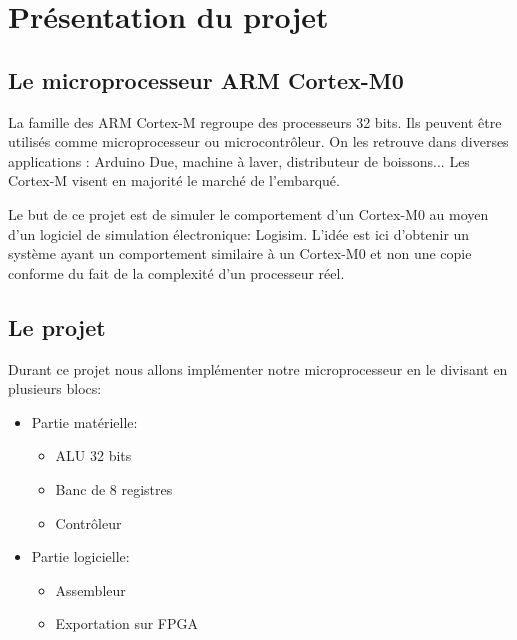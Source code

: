 \documentclass{article}
\begin{document}
    \section{Présentation du projet}

    \subsection{Le microprocesseur ARM Cortex-M0}

    La famille des ARM Cortex-M regroupe des processeurs 32 bits.
    Ils peuvent être utilisés comme microprocesseur ou microcontrôleur.
    On les retrouve dans diverses applications : Arduino Due, machine à laver, distributeur de boissons... Les Cortex-M visent en majorité le marché de l'embarqué.

    Le but de ce projet est de simuler le comportement d'un Cortex-M0 au moyen d'un logiciel de simulation électronique: Logisim.
    L'idée est ici d'obtenir un système ayant un comportement similaire à un Cortex-M0 et non une copie conforme du fait de la complexité d'un processeur réel.

    \subsection{Le projet}
    Durant ce projet nous allons implémenter notre microprocesseur en le divisant en plusieurs blocs:
    \begin{itemize}
        \item Partie matérielle:
        \begin{itemize}
            \item ALU 32 bits
            \item Banc de 8 registres
            \item Contrôleur
        \end{itemize}
        \item Partie logicielle:
        \begin{itemize}
            \item Assembleur
            \item Exportation sur FPGA
        \end{itemize}
    \end{itemize}
\end{document}
